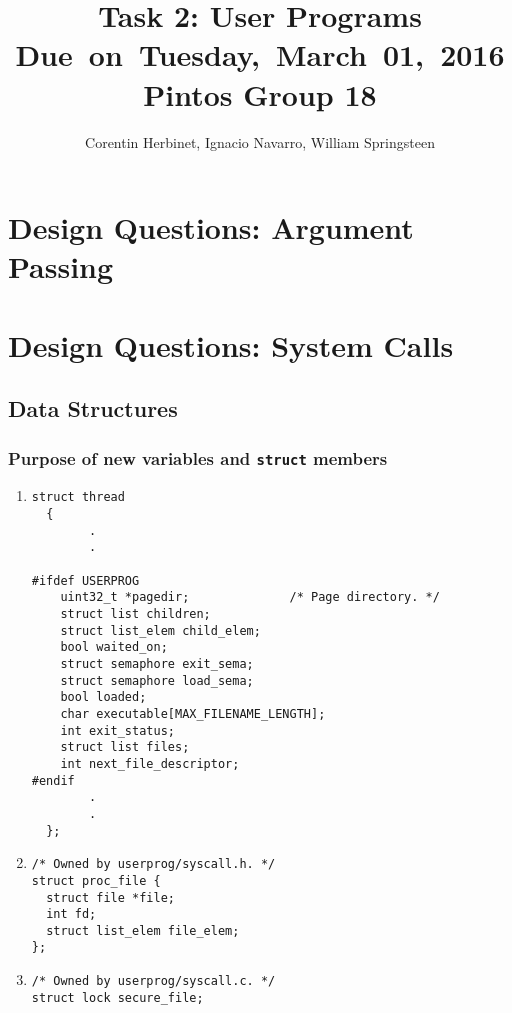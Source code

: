 \documentclass{article}
\title{
\vspace{2in}
\textmd{\textbf{Task 2: User Programs}}\\
\normalsize\vspace{0.1in}\small{Due\ on\ Tuesday,\ March\ 01,\ 2016}\\
\vspace{0.1in}\large{\textbf{Pintos Group 18}}
\vspace{3in}
}
\author{Corentin Herbinet, Ignacio Navarro, William Springsteen}
\date{}
\renewcommand{\_}{\char`_}
\begin{document}
\maketitle
\newpage

\section{Design Questions: Argument Passing}
\section{Design Questions: System Calls}
\subsection{Data Structures}
\subsubsection{Purpose of new variables and \texttt{struct} members}
\begin{enumerate}

\item \begin{lstlisting}
struct thread
  {
		.
		.
		
#ifdef USERPROG
    uint32_t *pagedir;              /* Page directory. */
    struct list children;
    struct list_elem child_elem;  
    bool waited_on;        
    struct semaphore exit_sema;  
    struct semaphore load_sema;  
    bool loaded;
    char executable[MAX_FILENAME_LENGTH]; 
    int exit_status;
    struct list files;        
    int next_file_descriptor;  
#endif
		.
		.
  };
\end{lstlisting}

\item \begin{lstlisting}
/* Owned by userprog/syscall.h. */
struct proc_file {
  struct file *file;
  int fd;
  struct list_elem file_elem;
};
\end{lstlisting}

\item \begin{lstlisting}
/* Owned by userprog/syscall.c. */
struct lock secure_file;
\end{lstlisting}

\end{enumerate}
\end{document}
